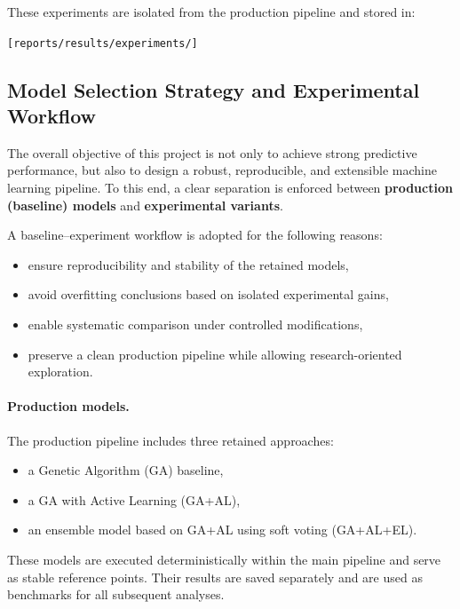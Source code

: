 \documentclass[12pt,a4paper]{article}
\begin{document}
These experiments are isolated from the production pipeline and stored in:
\begin{center}
\texttt{[reports/results/experiments/]}
\end{center}

\subsection{Model Selection Strategy and Experimental Workflow}

The overall objective of this project is not only to achieve strong predictive performance, but also to design a robust, reproducible, and extensible machine learning pipeline. To this end, a clear separation is enforced between \textbf{production (baseline) models} and \textbf{experimental variants}.

\medskip

A baseline--experiment workflow is adopted for the following reasons:
\begin{itemize}
    \item ensure reproducibility and stability of the retained models,
    \item avoid overfitting conclusions based on isolated experimental gains,
    \item enable systematic comparison under controlled modifications,
    \item preserve a clean production pipeline while allowing research-oriented exploration.
\end{itemize}

\medskip

\paragraph{Production models.}
The production pipeline includes three retained approaches:
\begin{itemize}
    \item a Genetic Algorithm (GA) baseline,
    \item a GA with Active Learning (GA+AL),
    \item an ensemble model based on GA+AL using soft voting (GA+AL+EL).
\end{itemize}

These models are executed deterministically within the main pipeline and serve as stable reference points. Their results are saved separately and are used as benchmarks for all subsequent analyses.

\medskip
\end{document}
